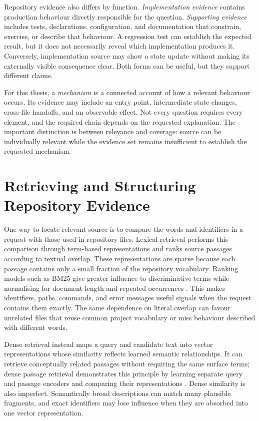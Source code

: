 Repository evidence also differs by function. \emph{Implementation evidence} contains production behaviour directly responsible for the question. \emph{Supporting evidence} includes tests, declarations, configuration, and documentation that constrain, exercise, or describe that behaviour. A regression test can establish the expected result, but it does not necessarily reveal which implementation produces it. Conversely, implementation source may show a state update without making its externally visible consequence clear. Both forms can be useful, but they support different claims.

For this thesis, a \emph{mechanism} is a connected account of how a relevant behaviour occurs. Its evidence may include an entry point, intermediate state changes, cross-file handoffs, and an observable effect. Not every question requires every element, and the required chain depends on the requested explanation. The important distinction is between relevance and coverage: source can be individually relevant while the evidence set remains insufficient to establish the requested mechanism.

\section{Retrieving and Structuring Repository Evidence}\label{sec:retrieving-and-structuring-repository-evidence}

One way to locate relevant source is to compare the words and identifiers in a request with those used in repository files. Lexical retrieval performs this comparison through term-based representations and ranks source passages according to textual overlap. These representations are sparse because each passage contains only a small fraction of the repository vocabulary. Ranking models such as BM25 give greater influence to discriminative terms while normalising for document length and repeated occurrences \cite{Robertson2009BM25}. This makes identifiers, paths, commands, and error messages useful signals when the request contains them exactly. The same dependence on literal overlap can favour unrelated files that reuse common project vocabulary or miss behaviour described with different words.

Dense retrieval instead maps a query and candidate text into vector representations whose similarity reflects learned semantic relationships. It can retrieve conceptually related passages without requiring the same surface terms; dense passage retrieval demonstrates this principle by learning separate query and passage encoders and comparing their representations \cite{Karpukhin2020DPR}. Dense similarity is also imperfect. Semantically broad descriptions can match many plausible fragments, and exact identifiers may lose influence when they are absorbed into one vector representation.

